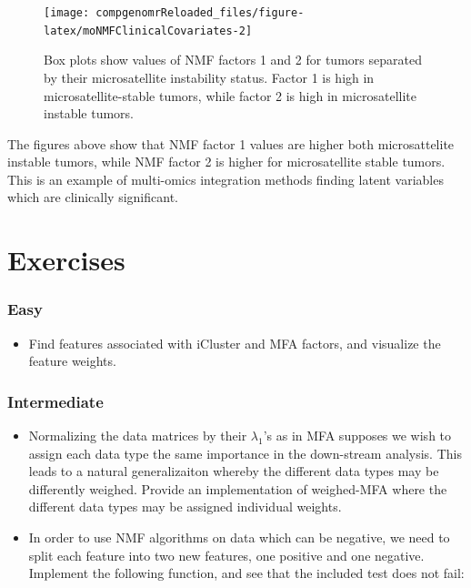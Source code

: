 \documentclass[12pt,]{krantz}
\providecommand{\tightlist}{%
  \setlength{\itemsep}{0pt}\setlength{\parskip}{0pt}}
\begin{document}
\begin{figure}

{\centering \texttt{[image: compgenomrReloaded\_files/figure-latex/moNMFClinicalCovariates-2]} 

}

\caption{Box plots show values of NMF factors 1 and 2 for tumors separated by their microsatellite instability status. Factor 1 is high in microsatellite-stable tumors, while factor 2 is high in microsatellite instable tumors.}\label{fig:moNMFClinicalCovariates2}
\end{figure}

The figures above show that NMF factor 1 values are higher both microsattelite instable tumors, while NMF factor 2 is higher for microsatellite stable tumors. This is an example of multi-omics integration methods finding latent variables which are clinically significant.

\hypertarget{exercises-8}{%
\section{Exercises}\label{exercises-8}}

\hypertarget{easy}{%
\subsubsection{Easy}\label{easy}}

\begin{itemize}
\tightlist
\item
  Find features associated with iCluster and MFA factors, and visualize the feature weights.
\end{itemize}

\hypertarget{intermediate}{%
\subsubsection{Intermediate}\label{intermediate}}

\begin{itemize}
\item
  Normalizing the data matrices by their \(\lambda_1\)'s as in MFA supposes we wish to assign each data type the same importance in the down-stream analysis. This leads to a natural generalizaiton whereby the different data types may be differently weighed. Provide an implementation of weighed-MFA where the different data types may be assigned individual weights.
\item
  In order to use NMF algorithms on data which can be negative, we need to split each feature into two new features, one positive and one negative. Implement the following function, and see that the included test does not fail:
\end{itemize}
\end{document}
